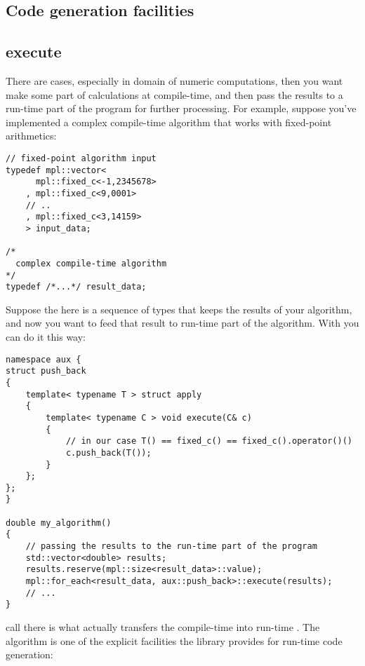 \documentclass{kapproc}
\begin{document}
\subsection{Code generation facilities}

\subsection{execute}

There are cases, especially in domain of numeric computations, then 
you want make some part of calculations at compile-time, and then 
pass the results to a run-time part of the program for further 
processing. For example, suppose you've implemented a complex 
compile-time algorithm that works with fixed-point arithmetics:

{\small
\begin{codesamp}\begin{verbatim}
// fixed-point algorithm input
typedef mpl::vector<
      mpl::fixed_c<-1,2345678>
    , mpl::fixed_c<9,0001>
    // ..
    , mpl::fixed_c<3,14159>
    > input_data;

/*
  complex compile-time algorithm 
*/
typedef /*...*/ result_data;
\end{verbatim}
\end{codesamp}
}

Suppose the  here is a sequence of 
 types that keeps the results of your 
algorithm, and now you want to feed that result to run-time part 
of the algorithm. With  you can do it this way:

{\small
\begin{codesamp}\begin{verbatim}
namespace aux {
struct push_back
{
    template< typename T > struct apply
    {
        template< typename C > void execute(C& c)
        {
            // in our case T() == fixed_c() == fixed_c().operator()()
            c.push_back(T());
        }
    };
};
}

double my_algorithm()
{
    // passing the results to the run-time part of the program
    std::vector<double> results;
    results.reserve(mpl::size<result_data>::value);
    mpl::for_each<result_data, aux::push_back>::execute(results);
    // ...
}
\end{verbatim}
\end{codesamp}
}

 call there is what actually 
transfers the compile-time  into run-time 
. The  algorithm 
is one of the explicit facilities the library provides for run-time 
code generation:
\end{document}
